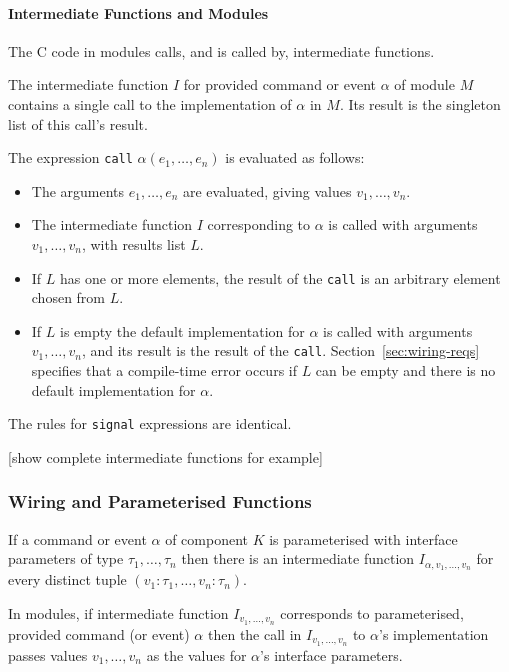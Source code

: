 \documentclass[11pt]{article}
\newcommand{\code}[1]{{\tt #1}}
\begin{document}
\paragraph{Intermediate Functions and Modules}

The C code in modules calls, and is called by, intermediate functions. 

The intermediate function $I$ for provided command or event $\alpha$ of
module $M$ contains a single call to the implementation of $\alpha$ in
$M$. Its result is the singleton list of this call's result.

The expression \code{call} $\alpha(e_1, \ldots, e_n)$ is evaluated as
follows:
\begin{itemize}
\item The arguments $e_1, \ldots, e_n$ are evaluated, giving values $v_1,
\ldots, v_n$.
\item The intermediate function $I$ corresponding to $\alpha$ is called
with arguments $v_1, \ldots, v_n$, with results list $L$.
\item If $L$ has one or more elements, the result of the \code{call} is an
arbitrary element chosen from $L$.
\item If $L$ is empty the default implementation for $\alpha$ is
called with arguments $v_1, \ldots, v_n$, and its result is the result of
the \code{call}. Section~\ref{sec:wiring-reqs} specifies that a
compile-time error occurs if $L$ can be empty and there is no default
implementation for $\alpha$.
\end{itemize}
The rules for \code{signal} expressions are identical.

[show complete intermediate functions for example]

\subsubsection{Wiring and Parameterised Functions}
\label{sec:wiring-parms}

If a command or event $\alpha$ of component $K$ is parameterised with
interface parameters of type $\tau_1, \ldots, \tau_n$ then there is an
intermediate function $I_{\alpha,v_1,\ldots,v_n}$ for every distinct tuple
$(v_1:\tau_1, \ldots, v_n:\tau_n)$.

In modules, if intermediate function $I_{v_1, \ldots, v_n}$ corresponds
to parameterised, provided command (or event) $\alpha$ then the call in
$I_{v_1, \ldots, v_n}$ to $\alpha$'s implementation passes values $v_1,
\ldots, v_n$ as the values for $\alpha$'s interface parameters. 
\end{document}

